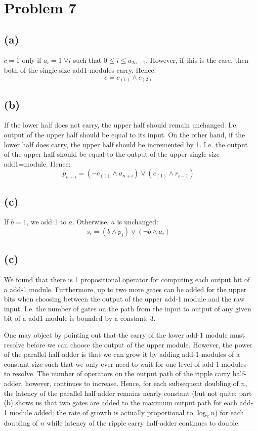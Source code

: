 \documentclass{article}
\begin{document}
\pagebreak

\section{Problem 7}
\subsection{(a)}
$c = 1$ only if $a_i = 1 \; \forall i$ such that $0 \le i \le a_{2n + 1}$. However, if this is the case, then both of the single size add1-modules carry. Hence:
\[
	c = c_{(1)} \land c_{(2)}
\]

\subsection{(b)}
If the lower half does not carry, the upper half should remain unchanged. I.e. output of the upper half should be equal to its input. On the other hand, if the lower half does carry, the upper half should be incremented by 1. I.e. the output of the upper half should be equal to the output of the upper single-size add1=module. Hence:
\[
	p_{n+i} = (\neg c_{(1)} \land a_{n+i}) \lor (c_{(1)} \land r_{i-1})
\]

\subsection{(c)}
If $b = 1$, we add 1 to $a$. Otherwise, $a$ is unchanged:
\[
	s_i = (b \land p_i) \lor (\neg b \land a_i)
\]

\subsection{(c)}
We found that there is 1 propositional operator for computing each output bit of a add-1 module. Furthermore, up to two more gates can be added for the upper bits when choosing between the output of the upper add-1 module and the raw input.  I.e. the number of gates on the path from the input to output of any given bit of a add1-module is bounded by a constant: $3$.

One may object by pointing out that the carry of the lower add-1 module must resolve before we can choose the output of the upper module. However, the power of the parallel half-adder is that we can grow it by adding add-1 modules of a constant size such that we only ever need to wait for one level of add-1 modules to resolve. The number of operators on the output path of the ripple carry half-adder, however, continues to increase. Hence, for each subsequent doubling of $n$, the latency of the parallel half adder remains nearly constant (but not quite; part (b) shows us that two gates are added to the maximum output path for each add-1 module added; the rate of growth is actually proportional to $\log_2 n$) for each doubling of $n$ while latency of the ripple carry half-adder continues to double.
\end{document}
